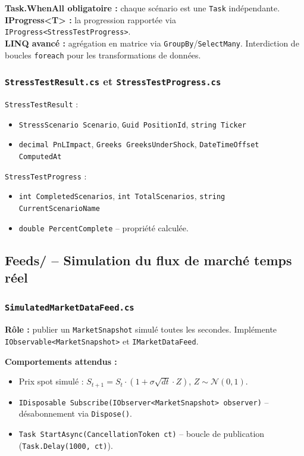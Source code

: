 \documentclass[a4paper,11pt]{article}
\newcommand{\cs}[1]{\texttt{\color{codeinline}#1}}
\begin{document}
\begin{tcolorbox}[constraint]
\textbf{Task.WhenAll obligatoire :} chaque sc\'enario est une \cs{Task} ind\'ependante.\\[4pt]
\textbf{IProgress<T> :} la progression rapport\'ee via \cs{IProgress<StressTestProgress>}.\\[4pt]
\textbf{LINQ avanc\'e :} agr\'egation en matrice via \cs{GroupBy}/\cs{SelectMany}.
Interdiction de boucles \cs{foreach} pour les transformations de donn\'ees.
\end{tcolorbox}

\subsubsection{\texttt{StressTestResult.cs} et \texttt{StressTestProgress.cs}}

\cs{StressTestResult} :
\begin{itemize}[leftmargin=1.5em]
  \item \cs{StressScenario Scenario}, \cs{Guid PositionId}, \cs{string Ticker}
  \item \cs{decimal PnLImpact}, \cs{Greeks GreeksUnderShock}, \cs{DateTimeOffset ComputedAt}
\end{itemize}

\cs{StressTestProgress} :
\begin{itemize}[leftmargin=1.5em]
  \item \cs{int CompletedScenarios}, \cs{int TotalScenarios}, \cs{string CurrentScenarioName}
  \item \cs{double PercentComplete} -- propri\'et\'e calcul\'ee.
\end{itemize}

\subsection{Feeds/ -- Simulation du flux de march\'e temps r\'eel}

\subsubsection{\texttt{SimulatedMarketDataFeed.cs}}

\textbf{R\^ole :} publier un \cs{MarketSnapshot} simul\'e toutes les secondes.
Impl\'emente \cs{IObservable<MarketSnapshot>} et \cs{IMarketDataFeed}.

\textbf{Comportements attendus :}
\begin{itemize}[leftmargin=1.5em]
  \item Prix spot simul\'e : $S_{t+1} = S_t \cdot (1 + \sigma\sqrt{dt} \cdot Z)$,
        $Z \sim \mathcal{N}(0,1)$.
  \item \cs{IDisposable Subscribe(IObserver<MarketSnapshot> observer)} -- d\'esabonnement
        via \cs{Dispose()}.
  \item \cs{Task StartAsync(CancellationToken ct)} -- boucle de publication
        (\cs{Task.Delay(1000, ct)}).
\end{itemize}
\end{document}
